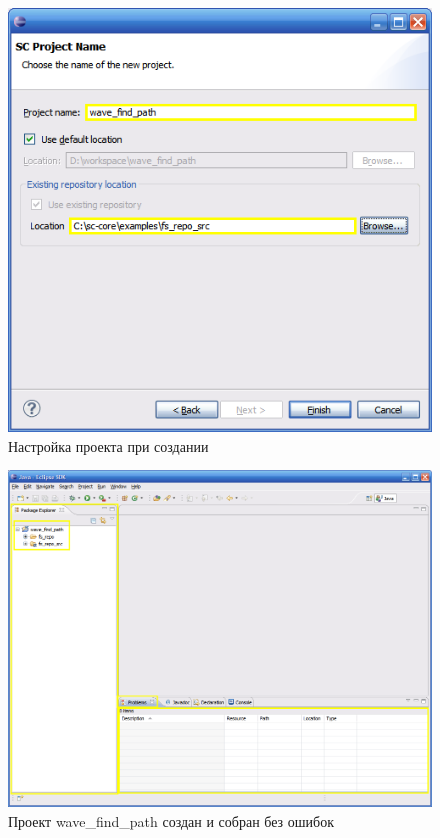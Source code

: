 \begin{figure}[h!]
  \centering
  \includegraphics[scale=0.7]{images/5/setup/4_Setup_project}
  \caption{Настройка проекта при создании}
  \label{fig:Setup_Setup_project}
\end{figure}

\begin{figure}[h!]
  \centering
  \includegraphics[scale=0.5]{images/5/setup/5_Project_created}
  \caption{Проект wave\_find\_path создан и собран без ошибок}
  \label{fig:Setup_Project_created}
\end{figure}

